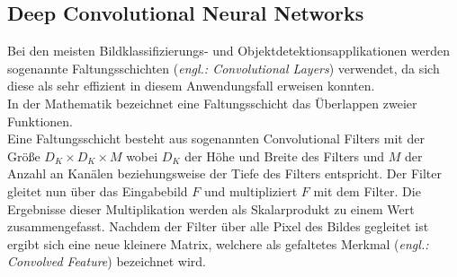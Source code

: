\documentclass[oneside]{ausarbeitung}
\begin{document}
\subsection{Deep Convolutional Neural Networks}
Bei den meisten Bildklassifizierungs- und Objektdetektionsapplikationen werden sogenannte Faltungsschichten (\textit{engl.: Convolutional Layers}) verwendet, da sich diese als sehr effizient in diesem Anwendungsfall erweisen konnten.\\
In der Mathematik bezeichnet eine Faltungsschicht das Überlappen zweier Funktionen.\\
Eine Faltungsschicht besteht aus sogenannten Convolutional Filters mit der Größe $D_K \times D_K \times M$ wobei $D_K$ der Höhe und Breite des Filters und $M$ der Anzahl an Kanälen beziehungsweise der Tiefe des Filters entspricht. Der Filter gleitet nun über das Eingabebild $F$ und multipliziert $F$ mit dem Filter. Die Ergebnisse dieser Multiplikation werden als Skalarprodukt zu einem Wert zusammengefasst. Nachdem der Filter über alle Pixel des Bildes gegleitet ist ergibt sich eine neue kleinere Matrix, welchere als gefaltetes Merkmal (\textit{engl.: Convolved Feature}) bezeichnet wird.
\end{document}
